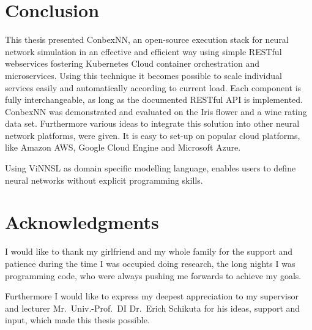 \chapter{Conclusion}\label{conclusion}

This thesis presented ConbexNN, an open-source execution stack for
neural network simulation in an effective and efficient way using simple
RESTful webservices fostering Kubernetes Cloud container orchestration
and microservices. Using this technique it becomes possible to scale
individual services easily and automatically according to current load.
Each component is fully interchangeable, as long as the documented
RESTful API is implemented. ConbexNN was demonstrated and evaluated on
the Iris flower and a wine rating data set. Furthermore various ideas to
integrate this solution into other neural network platforms, were given.
It is easy to set-up on popular cloud platforms, like Amazon AWS, Google
Cloud Engine and Microsoft Azure.

Using ViNNSL as domain specific modelling language, enables users to
define neural networks without explicit programming skills.

\chapter{Acknowledgments}\label{acknowledgments}

I would like to thank my girlfriend and my whole family for the support
and patience during the time I was occupied doing research, the long
nights I was programming code, who were always pushing me forwards to
achieve my goals.

Furthermore I would like to express my deepest appreciation to my
supervisor and lecturer Mr.~Univ.-Prof.~DI Dr.~Erich Schikuta for his
ideas, support and input, which made this thesis possible.
